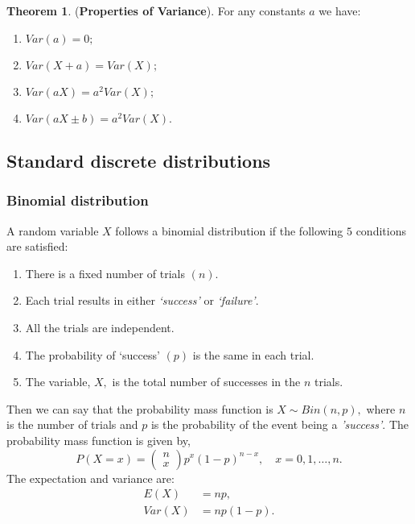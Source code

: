 \documentclass[12pt, a4paper]{article}
\theoremstyle{definition}
\newtheorem{theorem}{Theorem}[section]
\theoremstyle{plain}
\begin{document}
\begin{theorem}
(\textbf{Properties of Variance}). For any constants $a$ we have: 

\begin{enumerate}

	\item $Var(a)=0;$

	\item $Var(X+a)=Var(X);$

	\item $Var(aX)=a^2Var(X);$
	
	\item $Var(aX\pm b)=a^2Var(X).$

\end{enumerate}
\end{theorem}

\subsection{Standard discrete distributions}
	
\subsubsection{Binomial distribution}
A random variable $X$ follows a binomial distribution if the following $5$ conditions are satisfied: \begin{enumerate}
	
	\item There is a fixed number of trials $(n).$

	\item Each trial results in either \textit{`success'} or \textit{`failure'}.

	\item All the trials are independent.

	\item The probability of `success' $(p)$ is the same in each trial.

	\item The variable, $X,$ is the total number of successes in the $n$ trials. 

\end{enumerate} Then we can say that  the probability mass function is $X \sim Bin(n,p),$ where $n$ is the number of trials and $p$ is the probability of the event being a \textit{'success'}. The probability mass function is given by, $$P(X=x) = \begin{pmatrix} n\\x \end{pmatrix}p^x(1-p)^{n-x}, \quad x=0,1,\ldots,n.$$ The expectation and variance are: $$\begin{aligned}E(X)&=np, \\ Var(X)&=np(1-p).\end{aligned}$$
\end{document}
